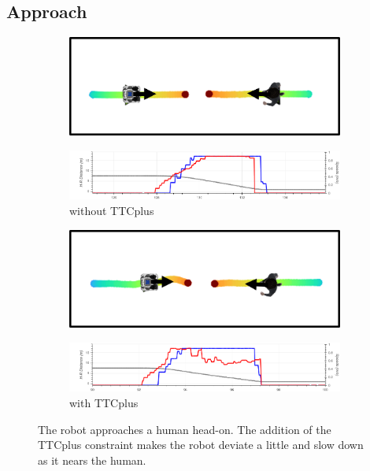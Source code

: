 \subsection{Approach}
\begin{figure}[!htb]
\centering
\begin{subfigure}{0.5\columnwidth}
  \includegraphics[width=\textwidth]{images/appendix/ttc/approach/approach_without.png}
\end{subfigure}
\vspace{0.5cm}
\begin{subfigure}{0.8\columnwidth}
  \includegraphics[width=\textwidth]{images/appendix/ttc/approach/without.png}
  \caption{without TTCplus}
\end{subfigure}

\begin{subfigure}{0.5\columnwidth}
  \includegraphics[width=\textwidth]{images/appendix/ttc/approach/approach_with.png}
\end{subfigure}
\begin{subfigure}{0.8\columnwidth}
  \includegraphics[width=\textwidth]{images/appendix/ttc/approach/with1.png}
  \caption{with TTCplus}
\end{subfigure}
\caption{The robot approaches a human head-on. The addition of the TTCplus constraint makes the robot deviate a little and slow down as it nears the human.}
\label{fig:approach_ttc}
\end{figure} 

